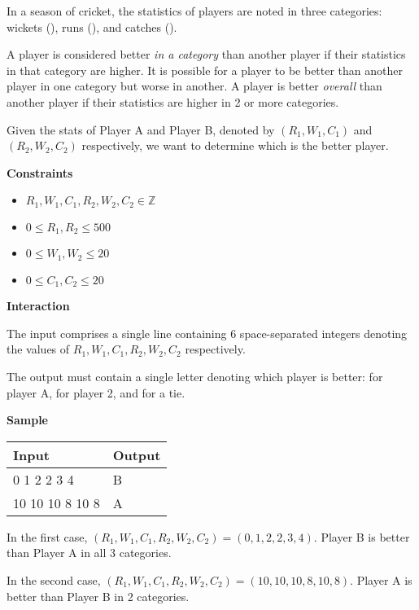 \documentclass[a4paper]{exam}
\newcommand\heading[1]{\textbf{#1}}
\newcommand\inz{\in \mathbb{Z}}
\begin{document}
\begin{questions}

      In a season of cricket, the statistics of players are noted in three categories: wickets (), runs (), and catches ().

      A player is considered better \textit{in a category} than another player if their statistics in that category are higher. It is possible for a player to be better than another player in one category but worse in another. A player is better \textit{overall} than another player if their statistics are higher in 2 or more categories.

    Given the stats of Player A and Player B, denoted by $(R_1,W_1,C_1)$ and $(R_2,W_2,C_2)$ respectively, we want to determine which is the better player.

    \heading{Constraints}
    \begin{itemize}
    \item  $R_1,W_1,C_1, R_2,W_2,C_2 \inz$
        \item $0 \le R_1, R_2 \le 500$
        \item $0 \le W_1, W_2 \le 20$
        \item $0 \le C_1, C_2 \le 20$
    \end{itemize}

    \heading{Interaction}

    The input comprises a single line containing 6 space-separated integers denoting the values of $R_1,W_1,C_1,R_2,W_2,C_2$ respectively.

    The output must contain a single letter denoting which player is better:  for player A,  for player 2,  and  for a tie.

    \heading{Sample}

    \begin{tabularx}{\textwidth}{|X|X|}
        \rowcolor{gray!50}
        \hline
        Input           & Output \\ \hline\hline
        0 1 2 2 3 4     & B      \\\hline
        10 10 10 8 10 8 & A      \\\hline
    \end{tabularx}

    In the first case, $(R_1,W_1,C_1,R_2,W_2,C_2)=(0,1,2,2,3,4)$. Player B is better than Player A in all 3 categories.

    In the second case, $(R_1,W_1,C_1,R_2,W_2,C_2)=(10,10,10,8,10,8)$. Player A is better than Player B in 2 categories.


\end{questions}
\end{document}
